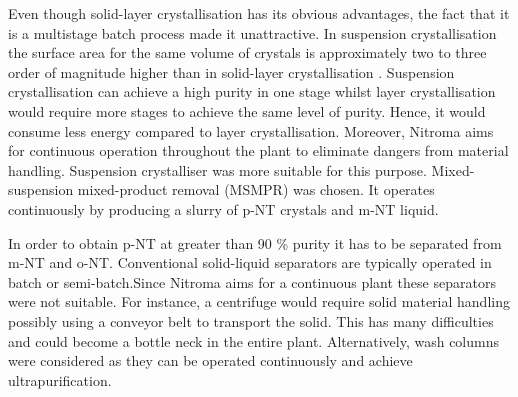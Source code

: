 Even though solid-layer crystallisation has its obvious advantages, the fact that it is a multistage batch process made it unattractive. In suspension crystallisation the surface area for the same volume of crystals is approximately two to three order of magnitude higher than in solid-layer crystallisation \cite{noauthor_types_nodate}. Suspension crystallisation can achieve a high purity in one stage whilst layer crystallisation would require more stages to achieve the same level of purity. Hence, it would consume less energy compared to layer crystallisation. Moreover, Nitroma aims for continuous operation throughout the plant to eliminate dangers from material handling. Suspension crystalliser was more suitable for this purpose. Mixed-suspension mixed-product removal (MSMPR) was chosen. It operates continuously by producing a slurry of p-NT crystals and m-NT liquid.

In order to obtain p-NT at greater than 90 \% purity it has to be separated from m-NT and o-NT. Conventional solid-liquid separators are typically operated in batch or semi-batch.Since Nitroma aims for a continuous plant these separators were not suitable. For instance, a centrifuge would require  solid material handling possibly using a conveyor belt to transport the solid. This has many difficulties and could become a bottle neck in the entire plant. Alternatively, wash columns were considered as they can be operated continuously and achieve ultrapurification. 

